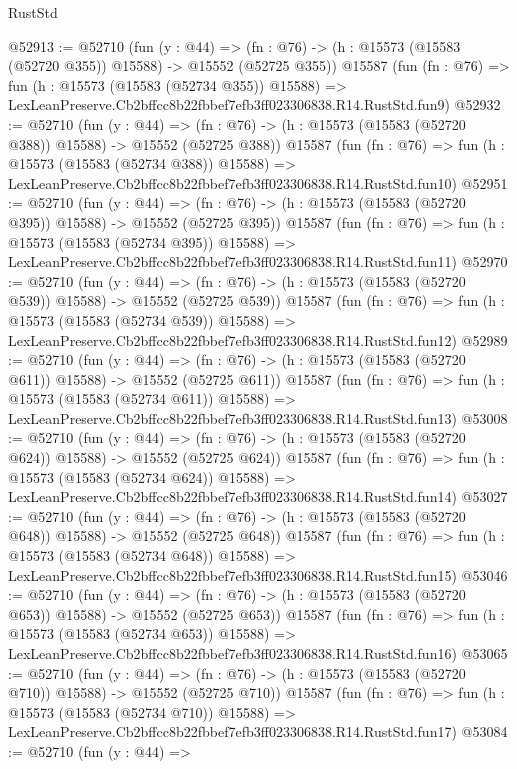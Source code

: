 \begin{lexlean}{RustStd}
\begin{coremodule}
@52913 := @52710
    (fun (y : @44) =>
    (fn : @76) -> (h : @15573 (@15583 (@52720 @355)) @15588) -> @15552 (@52725 @355))
    @15587
    (fun (fn : @76) =>
    fun (h : @15573 (@15583 (@52734 @355)) @15588) =>
    LexLeanPreserve.Cb2bffcc8b22fbbef7efb3ff023306838.R14.RustStd.fun9)
@52932 := @52710
    (fun (y : @44) =>
    (fn : @76) -> (h : @15573 (@15583 (@52720 @388)) @15588) -> @15552 (@52725 @388))
    @15587
    (fun (fn : @76) =>
    fun (h : @15573 (@15583 (@52734 @388)) @15588) =>
    LexLeanPreserve.Cb2bffcc8b22fbbef7efb3ff023306838.R14.RustStd.fun10)
@52951 := @52710
    (fun (y : @44) =>
    (fn : @76) -> (h : @15573 (@15583 (@52720 @395)) @15588) -> @15552 (@52725 @395))
    @15587
    (fun (fn : @76) =>
    fun (h : @15573 (@15583 (@52734 @395)) @15588) =>
    LexLeanPreserve.Cb2bffcc8b22fbbef7efb3ff023306838.R14.RustStd.fun11)
@52970 := @52710
    (fun (y : @44) =>
    (fn : @76) -> (h : @15573 (@15583 (@52720 @539)) @15588) -> @15552 (@52725 @539))
    @15587
    (fun (fn : @76) =>
    fun (h : @15573 (@15583 (@52734 @539)) @15588) =>
    LexLeanPreserve.Cb2bffcc8b22fbbef7efb3ff023306838.R14.RustStd.fun12)
@52989 := @52710
    (fun (y : @44) =>
    (fn : @76) -> (h : @15573 (@15583 (@52720 @611)) @15588) -> @15552 (@52725 @611))
    @15587
    (fun (fn : @76) =>
    fun (h : @15573 (@15583 (@52734 @611)) @15588) =>
    LexLeanPreserve.Cb2bffcc8b22fbbef7efb3ff023306838.R14.RustStd.fun13)
@53008 := @52710
    (fun (y : @44) =>
    (fn : @76) -> (h : @15573 (@15583 (@52720 @624)) @15588) -> @15552 (@52725 @624))
    @15587
    (fun (fn : @76) =>
    fun (h : @15573 (@15583 (@52734 @624)) @15588) =>
    LexLeanPreserve.Cb2bffcc8b22fbbef7efb3ff023306838.R14.RustStd.fun14)
@53027 := @52710
    (fun (y : @44) =>
    (fn : @76) -> (h : @15573 (@15583 (@52720 @648)) @15588) -> @15552 (@52725 @648))
    @15587
    (fun (fn : @76) =>
    fun (h : @15573 (@15583 (@52734 @648)) @15588) =>
    LexLeanPreserve.Cb2bffcc8b22fbbef7efb3ff023306838.R14.RustStd.fun15)
@53046 := @52710
    (fun (y : @44) =>
    (fn : @76) -> (h : @15573 (@15583 (@52720 @653)) @15588) -> @15552 (@52725 @653))
    @15587
    (fun (fn : @76) =>
    fun (h : @15573 (@15583 (@52734 @653)) @15588) =>
    LexLeanPreserve.Cb2bffcc8b22fbbef7efb3ff023306838.R14.RustStd.fun16)
@53065 := @52710
    (fun (y : @44) =>
    (fn : @76) -> (h : @15573 (@15583 (@52720 @710)) @15588) -> @15552 (@52725 @710))
    @15587
    (fun (fn : @76) =>
    fun (h : @15573 (@15583 (@52734 @710)) @15588) =>
    LexLeanPreserve.Cb2bffcc8b22fbbef7efb3ff023306838.R14.RustStd.fun17)
@53084 := @52710
    (fun (y : @44) =>

\end{coremodule}
\end{lexlean}
